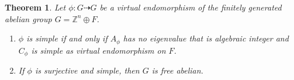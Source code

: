 \documentclass[a4paper,12pt]{amsart}
\newtheorem{theorem}{Theorem}
\theoremstyle{definition}
\begin{document}
	
	\begin{theorem}\label{theorem: self-similar fintely generated}
		Let $\phi : G \dashrightarrow G$ be a virtual endomorphism  of the finitely generated abelian group $G = \mathbb{Z}^n \oplus F$. 
		
		\begin{enumerate}[label=\arabic*.]
			\item $\phi$ is simple if and only if $A_\phi$ has no eigenvalue that is algebraic integer and $C_\phi$ is simple as virtual endomorphism on $F$.
			
			\item If $\phi$ is surjective and simple, then $G$ is free abelian.
		\end{enumerate}
		
	\end{theorem}
	
\end{document}
